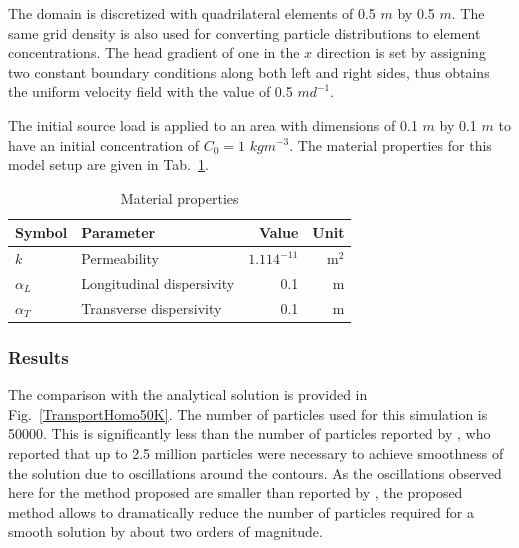 The domain is discretized with quadrilateral elements of 0.5 $m$ by 0.5 $m$. The same grid density is also used for converting particle distributions to element concentrations. The head gradient of one in the $x$ direction is set by assigning two constant boundary conditions along both left and right sides, thus obtains the uniform velocity field with the value of 0.5 $md^{-1}$.

The initial source load is applied to an area with dimensions of 0.1 $m$ by 0.1 $m$ to have an initial concentration of $C _0=1$ $kg m^{-3}$. The material properties for this model setup are given in Tab.~\ref{tab-2dhomo}.

\begin{table}[htbp!]
\caption{\label{tab-2dhomo}Material properties}
\begin{center}
\begin{tabular}{llrr}
\toprule
Symbol & Parameter & Value & Unit \\
\midrule
$k$ & Permeability & $1.114^{-11}$ & m$^{2}$ \\			
$\alpha _L$	   & Longitudinal dispersivity & 0.1 & m \\
$\alpha _T$	   & Transverse dispersivity & 0.1 & m \\
\bottomrule
\end{tabular}
\end{center}
\end{table}

\subsubsection{Results}

The comparison with the analytical solution is provided in Fig.~\ref{TransportHomo50K}. The number of particles used for this simulation is 50000. This is significantly less than the number of particles reported by \cite{aH03}, who reported that up to 2.5 million particles were necessary to achieve smoothness of the solution due to oscillations around the contours. As the oscillations observed here for the method proposed are smaller than reported by \cite{aH03}, the proposed method allows to dramatically reduce the number of particles required for a smooth solution by about two orders of magnitude.


